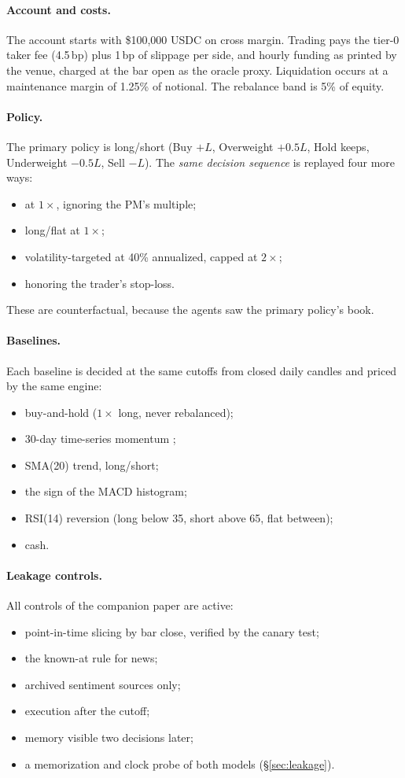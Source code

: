 \paragraph{Account and costs.} The account starts with \$100{,}000 USDC on cross margin. Trading pays the tier-0 taker fee (4.5\,bp) plus 1\,bp of slippage per side, and hourly funding as printed by the venue, charged at the bar open as the oracle proxy. Liquidation occurs at a maintenance margin of 1.25\% of notional. The rebalance band is 5\% of equity.

\paragraph{Policy.} The primary policy is long/short (Buy $+L$, Overweight $+0.5L$, Hold keeps, Underweight $-0.5L$, Sell $-L$). The \emph{same decision sequence} is replayed four more ways:
\begin{itemize}
\item at $1\times$, ignoring the PM's multiple;
\item long/flat at $1\times$;
\item volatility-targeted at 40\% annualized, capped at $2\times$;
\item honoring the trader's stop-loss.
\end{itemize}
These are counterfactual, because the agents saw the primary policy's book.

\paragraph{Baselines.} Each baseline is decided at the same cutoffs from closed daily candles and priced by the same engine:
\begin{itemize}
\item buy-and-hold ($1\times$ long, never rebalanced);
\item 30-day time-series momentum \citep{moskowitz2012time};
\item SMA(20) trend, long/short;
\item the sign of the MACD histogram;
\item RSI(14) reversion (long below 35, short above 65, flat between);
\item cash.
\end{itemize}

\paragraph{Leakage controls.} All controls of the companion paper are active:
\begin{itemize}
\item point-in-time slicing by bar close, verified by the canary test;
\item the known-at rule for news;
\item archived sentiment sources only;
\item execution after the cutoff;
\item memory visible two decisions later;
\item a memorization and clock probe of both models (\S\ref{sec:leakage}).
\end{itemize}

